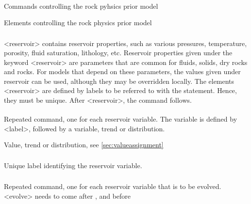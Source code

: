 {\subsection{}
 \slist
   \item \Description Commands controlling the rock pyhsics prior model
   \item \Argument Elements controlling the rock physics prior model
   \item \Default
 \elist

\subsubsection{}
 \slist
   \item \Description <reservoir> contains reservoir properties, such as various pressures, temperature, porosity, fluid saturation, lithology, etc. Reservoir properties given under the keyword <reservoir> are parameters that are common for fluids, solids, dry rocks and rocks. For models that depend on these parameters, the values given under reservoir can be used, although they may be overridden locally. The elements <reservoir> are defined by labels to be referred to with the  statement. Hence, they must be unique. After <reservoir>, the command  follows.
   \item \Argument
   \item \Default
 \elist

\paragraph{}
 \slist
   \item \Description Repeated command, one for each reservoir variable. The variable is defined by <label>, followed by a variable, trend or distribution.
   \item \Argument Value, trend or distribution, see \autoref{sec:valueassignment}
   \item \Default
 \elist

\subparagraph{}
 \slist
   \item \Description Unique label identifying the reservoir variable.
   \item \Argument
   \item \Default
 \elist

\subsubsection{}
 \slist
   \item \Description Repeated command, one for each reservoir variable that is to be evolved. <evolve> needs to come after , and before 
   \item \Argument
   \item \Default
 \elist

}
